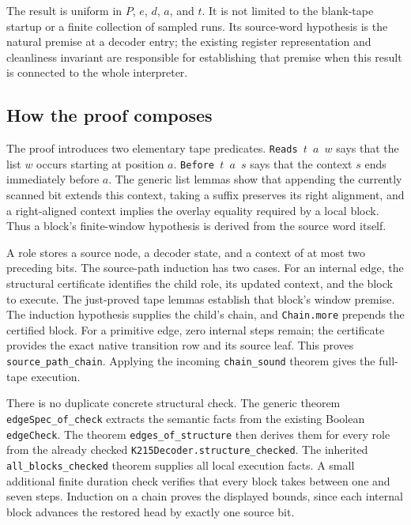 The result is uniform in $P$, $e$, $d$, $a$, and $t$. It is not limited to the
blank-tape startup or a finite collection of sampled runs. Its source-word
hypothesis is the natural premise at a decoder entry; the existing register
representation and cleanliness invariant are responsible for establishing
that premise when this result is connected to the whole interpreter.

\subsection{How the proof composes}

The proof introduces two elementary tape predicates.
\texttt{Reads $t$ $a$ $w$} says that the list $w$ occurs starting at position
$a$. \texttt{Before $t$ $a$ $s$} says that the context $s$ ends immediately
before $a$. The generic list lemmas show that appending the currently scanned
bit extends this context, taking a suffix preserves its right alignment, and
a right-aligned context implies the overlay equality required by a local
block. Thus a block's finite-window hypothesis is derived from the source
word itself.

A role stores a source node, a decoder state, and a context of at most two
preceding bits. The source-path induction has two cases. For an internal
edge, the structural certificate identifies the child role, its updated
context, and the block to execute. The just-proved tape lemmas establish that
block's window premise. The induction hypothesis supplies the child's chain,
and \texttt{Chain.more} prepends the certified block. For a primitive edge,
zero internal steps remain; the certificate provides the exact native
transition row and its source leaf. This proves
\texttt{source\_path\_chain}. Applying the incoming
\texttt{chain\_sound} theorem gives the full-tape execution.

There is no duplicate concrete structural check. The generic theorem
\texttt{edgeSpec\_of\_check} extracts the semantic facts from the existing
Boolean \texttt{edgeCheck}. The theorem \texttt{edges\_of\_structure}
then derives them for every role from the already checked
\texttt{K215Decoder.structure\_checked}. The inherited
\texttt{all\_blocks\_checked} theorem supplies all local execution facts.
A small additional finite duration check verifies that every block takes
between one and seven steps. Induction on a chain proves the displayed
bounds, since each internal block advances the restored head by exactly one
source bit.


